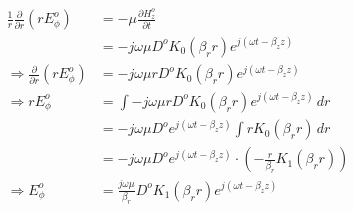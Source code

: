 \begin{equation}
	\begin{split}
		\frac{1}{r} \frac{\partial}{\partial r}(r E_\phi^o) &= -\mu \frac{\partial H_z^o}{\partial t} \\
		&= -j \omega \mu D^o K_0(\beta_r r) e^{j(\omega t - \beta_z z)} \\
		\Rightarrow \frac{\partial}{\partial r}(r E_\phi^o) &= -j \omega \mu r D^o K_0(\beta_r r) e^{j(\omega t - \beta_z z)} \\
		\Rightarrow r E_\phi^o &= \int -j \omega \mu r D^o K_0(\beta_r r) e^{j(\omega t - \beta_z z)} \, dr \\
		&= -j \omega \mu D^o e^{j(\omega t - \beta_z z)} \int r K_0(\beta_r r) \, dr \\
		&= -j \omega \mu D^o e^{j(\omega t - \beta_z z)} \cdot \left( -\frac{r}{\beta_r} K_1(\beta_r r) \right) \\
		\Rightarrow E_\phi^o &= \frac{j \omega \mu}{\beta_r} D^o K_1(\beta_r r) e^{j(\omega t - \beta_z z)}
	\end{split}
	\label{eq:Ephi_o}
\end{equation}

